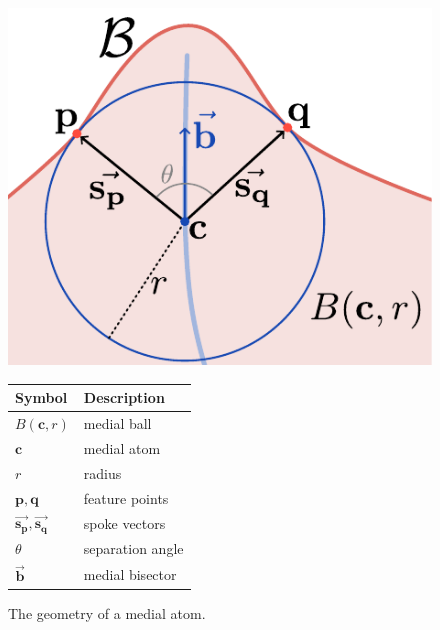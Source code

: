 \begin{figure}
	\centering
	\begin{minipage}[c]{0.4\linewidth}
		\includegraphics[width=\linewidth]{figs/medial_atom_geometry.pdf}
	\end{minipage}
	\begin{minipage}[c]{0.45\textwidth}
		\centering
		\begin{tabular}{ll}
			\toprule
			Symbol & Description \\
			\midrule
			$B(\mathbf{c},r)$& medial ball\\
			$\mathbf{c}$ & medial atom\\
			$r$ & radius\\
			$\mathbf{p}, \mathbf{q}$ & feature points\\
			$\vec{\mathbf{s_{p}}}, \vec{\mathbf{s_{q}}}$ & spoke vectors\\
			$\theta$ & separation angle\\
			$\vec{\mathbf{b}}$ & medial bisector\\
			\bottomrule
		\end{tabular}
	\end{minipage}
	\caption{The geometry of a medial atom.}
	\label{fig:medialgeometry}
\end{figure}

